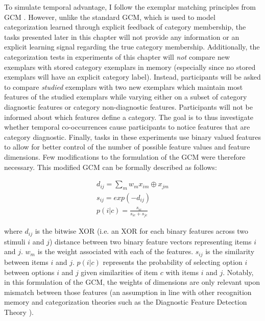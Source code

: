 To simulate temporal advantage, I follow the exemplar matching principles from GCM \parencite{nosofsky1994comparing,rouder2004comparing,nosofsky2011generalized,nosofsky1986attention}. However, unlike the standard GCM, which is used to model categorization learned through explicit feedback of category membership, the tasks presented later in this chapter will not provide any information or an explicit learning signal regarding the true category membership. Additionally, the categorization tests in experiments of this chapter will \textit{not} compare new exemplars with stored category exemplars in memory (especially since no stored exemplars will have an explicit category label). Instead, participants will be asked to compare \textit{studied} exemplars with two new exemplars which maintain most features of the studied exemplars while varying either on a subset of category diagnostic features or category non-diagnostic features. \ac{Participants will not be informed about which features define a category}.  The goal is to thus investigate whether temporal co-occurrences cause participants to notice features that are category diagnostic. Finally, tasks in these experiments use binary valued features to allow for better control of the number of possible feature values and feature dimensions. Few modifications to the formulation of the GCM were therefore necessary. This modified GCM can be formally described as follows:

\begin{equation}
    \begin{aligned}
        d_{ij} = \sum_{m} w_m x_{im} \oplus x_{jm} \\
        s_{ij} = exp(-d_{ij}) \\ 
        p(i|c) = \frac{s_{ic}}{s_{ic} + s_{jc}} 
    \end{aligned}
\end{equation}

where $d_{ij}$ is the bitwise XOR (i.e. an XOR for each binary features across two stimuli $i$ and $j$) distance between two binary feature vectors representing items $i$ and $j$. $w_m$ is the weight associated with each of the features. $s_{ij}$ is the similarity between items $i$ and $j$. $p(i|c)$ represents the probability of selecting option $i$ between options $i$ and $j$ given similarities of item $c$ with items $i$ and $j$. Notably, in this formulation of the GCM, the weights of dimensions are only relevant upon mismatch between those features (an assumption in line with other recognition memory and categorization theories such as the Diagnostic Feature Detection Theory \parencite{wixted2014signal}).

